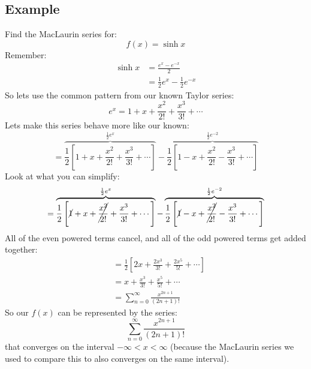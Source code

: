 \documentclass{report}
\begin{document}
    \subsection{Example}
        Find the MacLaurin series for:
        \[f(x) = \sinh x\]
        Remember:
        \begin{align*}
            \sinh x &= \frac{e^x - e^{-x}}{2} \\
            &= \frac{1}{2}e^x - \frac{1}{2}e^{-x}
        \end{align*}
        So lets use the common pattern from our known Taylor series:
        \[e^x = 1 + x + \frac{x^2}{2!} + \frac{x^3}{3!} + \cdots \]
        Lets make this series behave more like our known:
        \[= \overbrace{\frac{1}{2} \left[ 1 + x + \frac{x^2}{2!} + \frac{x^3}{3!} + \cdots \right]}^{\frac{1}{2}e^x} - \overbrace{\frac{1}{2} \left[ 1 - x + \frac{x^2}{2!} - \frac{x^3}{3!} + \cdots \right]}^{\frac{1}{2}e^{-2}}\]
        Look at what you can simplify:
        \[= \overbrace{\frac{1}{2} \left[ \cancel{1} + x + \cancel{\frac{x^2}{2!}} + \frac{x^3}{3!} + \cdots \right]}^{\frac{1}{2}e^x} - \overbrace{\frac{1}{2} \left[ \cancel{1} - x + \cancel{\frac{x^2}{2!}} - \frac{x^3}{3!} + \cdots \right]}^{\frac{1}{2}e^{-2}}\]
        All of the even powered terms cancel, and all of the odd powered terms get added together:
        \begin{align*}
            &= \frac{1}{2} \left[ 2x + \frac{2x^3}{3!} + \frac{2x^5}{5!} + \cdots \right] \\
            &= x + \frac{x^3}{3!} + \frac{x^5}{5!} + \cdots \\
            &= \sum_{n=0}^{\infty} \frac{x^{2n+1}}{(2n+1)!}
        \end{align*}
        So our \(f(x)\) can be represented by the series:
        \[\sum_{n=0}^{\infty} \frac{x^{2n+1}}{(2n+1)!}\]
        that converges on the interval \(- \infty < x < \infty\) (because the MacLaurin series we used to compare this to also converges on the same interval).
    
\end{document}
